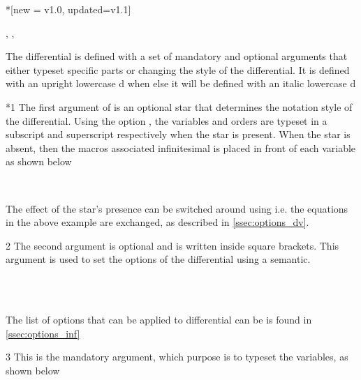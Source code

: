 	\begin{function}*{\odif}[new = v1.0, updated=v1.1]
		\begin{syntax}
			\sarg, , 
		\end{syntax}
		The differential  is defined with a set of mandatory and optional arguments that either typeset specific parts or changing the style of the differential. It is defined with an upright lowercase d when  else it will be defined with an italic lowercase d
		
		\begin{definition}
		\end{definition}
		
		\begin{argument}*{1}
			The first argument of  is an optional star that determines the notation style of the differential. Using the option , the variables and orders are typeset in a subscript and superscript respectively when the star is present. When the star is absent, then the macros associated infinitesimal is placed in front of each variable as shown below
			
			\begin{example}
				 \\
			\end{example}
			
			\noindent The effect of the star's presence can be switched around using  i.e. the equations in the above example are exchanged, as described in \cref{ssec:options_dv}.
		\end{argument}
		
		\begin{argument}{2}
			The second argument is optional and is written inside square brackets. This argument is used to set the options of the differential using a  semantic.
			
			\begin{example}
				\odif[order={n,3}]{x,y,z} \\
				\odif[sep-var-inf=0]{x,y,z} \\
				\odif*[sep-var-var=0]{x,y,z}
			\end{example}
			
			\noindent The list of options that can be applied to differential can be is found in \cref{ssec:options_inf}
		\end{argument}
		
		\begin{argument}{3}
			This is the mandatory argument, which purpose is to typeset the variables, as shown below
			
			\begin{example}
				\odif{x} \\
				\odif{s_1,s_2...,s_n}
			\end{example}
		\end{argument}
	\end{function}
	
